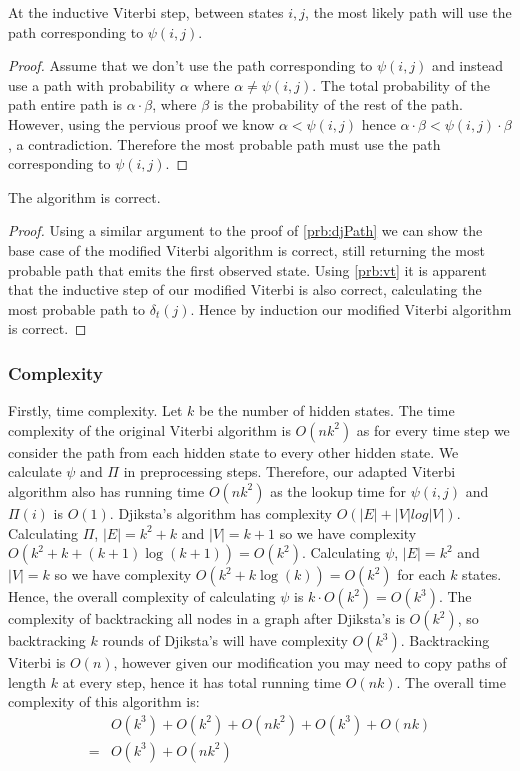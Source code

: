 \begin{lemma}
    \label{prb:vt}
    At the inductive Viterbi step, between states $i,j$, the most likely path will use the path corresponding to $\psi(i,j)$.
\end{lemma}
\begin{proof}
Assume that we don't use the path corresponding to $\psi(i,j)$ and instead use a path with probability $\alpha$ where $\alpha \neq \psi(i,j)$.
The total probability of the path entire path is $\alpha \cdot \beta$, where $\beta$ is the probability of the rest of the path.
However, using the pervious proof we know $\alpha < \psi(i,j)$ hence $\alpha \cdot \beta < \psi(i,j) \cdot \beta$, a contradiction. 
Therefore the most probable path must use the path corresponding to $\psi(i,j)$. 
\end{proof}

\begin{lemma}
    \label{prb:final}
    The algorithm is correct. 
\end{lemma}
\begin{proof}
Using a similar argument to the proof of \cref{prb:djPath} we can show the base case of the modified Viterbi algorithm is correct, still returning the most probable path that emits the first observed state. 
Using \cref{prb:vt} it is apparent that the inductive step of our modified Viterbi is also correct, calculating the most probable path to $\delta_t(j)$. Hence by induction our modified Viterbi algorithm is correct.
\end{proof}

  



\subsubsection*{Complexity}
Firstly, time complexity. 
Let $k$ be the number of hidden states.
The time complexity of the original Viterbi algorithm is $O(nk^2)$ as for every time step we consider the path from each hidden state to every other hidden state. We calculate $\psi$ and $\Pi$ in preprocessing steps.
Therefore, our adapted Viterbi algorithm also has running time $O(nk^2)$ as the lookup time for $\psi(i,j)$ and $\Pi(i)$ is $O(1)$.
Djiksta's algorithm has complexity $O(|E|+|V|log|V|)$.
Calculating $\Pi$, $|E| = k^2 + k$ and $|V| = k+1$ so we have complexity $O(k^2 + k + (k+1) \log(k+1)) = O(k^2)$.
Calculating $\psi$, $|E| = k^2$ and $|V| = k$ so we have complexity $O(k^2 + k \log(k)) = O(k^2)$ for each $k$ states. Hence, the overall complexity of calculating $\psi$ is $k\cdot O(k^2) = O(k^3)$.
The complexity of backtracking all nodes in a graph after Djiksta's is $O(k^2)$, so backtracking $k$ rounds of Djiksta's will have complexity $O(k^3)$.
Backtracking Viterbi is $O(n)$, however given our modification you may need to copy paths of length $k$ at every step, hence it has total running time $O(nk)$. The overall time complexity of this algorithm is:
\begin{align*}
&O(k^3) + O(k^2) + O(nk^2) + O(k^3) + O(nk)\\
=& O(k^3) + O(nk^2)
\end{align*}

